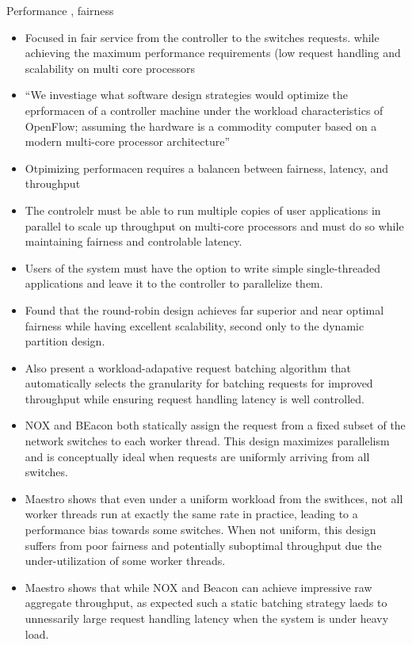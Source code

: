 \documentclass[12pt,openright,twoside]{report}
\begin{document}
\begin{itemize}
Performance , fairness 
\begin{itemize}
\item Focused in fair service from the controller to the switches requests. while achieving the maximum performance requirements (low request handling and scalability on multi core processors
\item ``We investiage what software design strategies would optimize the eprformacen of a controller machine under the workload characteristics of OpenFlow; assuming the hardware is a commodity computer based on a modern multi-core processor architecture''
\item Otpimizing performacen requires a balancen between fairness, latency, and throughput 
\item The controlelr must be able to run multiple copies of user applications in parallel to scale up throughput on multi-core processors and must do so while maintaining fairness and controlable latency.
\item Users of the system must have the option to write simple single-threaded applications and leave it to the controller to parallelize them. 
\item Found that the round-robin design achieves far superior and near optimal fairness while having excellent scalability, second only to the dynamic partition design. 
\item Also present a workload-adapative request batching algorithm that automatically selects the granularity for batching requests for improved throughput while ensuring request handling latency is well controlled. 
\item NOX and BEacon both statically assign the request from a fixed subset of the network switches to each worker thread. This design maximizes parallelism and is conceptually ideal when requests are uniformly arriving from all switches. 
\item Maestro shows that even under a uniform workload from the swithces, not all worker threads run at exactly the same rate in practice, leading to a performance bias towards some switches. When not uniform, this design suffers from poor fairness and potentially suboptimal throughput due the under-utilization of some worker threads. 
\item Maestro shows that while NOX and Beacon can achieve impressive raw aggregate throughput, as expected such a static batching strategy laeds to unnessarily large request handling latency when the system is under heavy load. 



\end{itemize}
\end{itemize}
\end{document}
